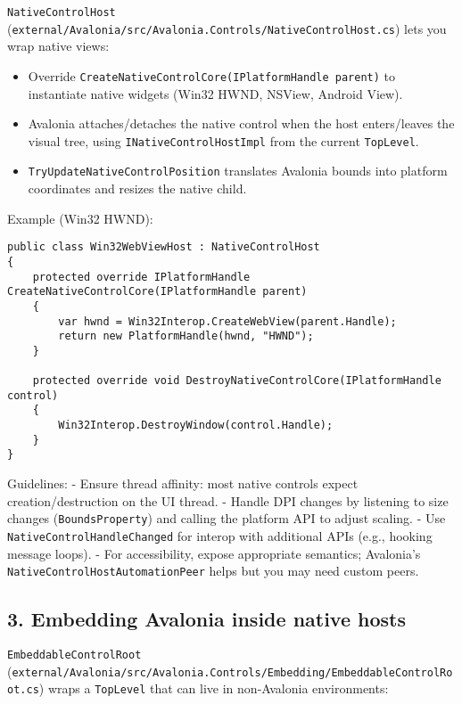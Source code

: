 \passthrough{\lstinline!NativeControlHost!}
(\passthrough{\lstinline!external/Avalonia/src/Avalonia.Controls/NativeControlHost.cs!})
lets you wrap native views:

\begin{itemize}
\tightlist
\item
  Override
  \passthrough{\lstinline!CreateNativeControlCore(IPlatformHandle parent)!}
  to instantiate native widgets (Win32 HWND, NSView, Android View).
\item
  Avalonia attaches/detaches the native control when the host
  enters/leaves the visual tree, using
  \passthrough{\lstinline!INativeControlHostImpl!} from the current
  \passthrough{\lstinline!TopLevel!}.
\item
  \passthrough{\lstinline!TryUpdateNativeControlPosition!} translates
  Avalonia bounds into platform coordinates and resizes the native
  child.
\end{itemize}

Example (Win32 HWND):

\begin{lstlisting}
public class Win32WebViewHost : NativeControlHost
{
    protected override IPlatformHandle CreateNativeControlCore(IPlatformHandle parent)
    {
        var hwnd = Win32Interop.CreateWebView(parent.Handle);
        return new PlatformHandle(hwnd, "HWND");
    }

    protected override void DestroyNativeControlCore(IPlatformHandle control)
    {
        Win32Interop.DestroyWindow(control.Handle);
    }
}
\end{lstlisting}

Guidelines: - Ensure thread affinity: most native controls expect
creation/destruction on the UI thread. - Handle DPI changes by listening
to size changes (\passthrough{\lstinline!BoundsProperty!}) and calling
the platform API to adjust scaling. - Use
\passthrough{\lstinline!NativeControlHandleChanged!} for interop with
additional APIs (e.g., hooking message loops). - For accessibility,
expose appropriate semantics; Avalonia's
\passthrough{\lstinline!NativeControlHostAutomationPeer!} helps but you
may need custom peers.

\subsection{3. Embedding Avalonia inside native
hosts}\label{embedding-avalonia-inside-native-hosts}

\passthrough{\lstinline!EmbeddableControlRoot!}
(\passthrough{\lstinline!external/Avalonia/src/Avalonia.Controls/Embedding/EmbeddableControlRoot.cs!})
wraps a \passthrough{\lstinline!TopLevel!} that can live in non-Avalonia
environments:

